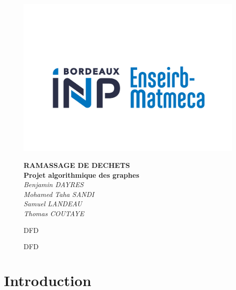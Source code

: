 \documentclass{report}
\begin{document}
\begin{titlepage}
\fancypagestyle{}{}
\begin{figure}[t]
    \centerline{\includegraphics[scale=0.4]{Logo.png}}
    \centering
	\vspace{1cm}
    {\huge\bfseries RAMASSAGE DE DECHETS \\}
    {\huge\bfseries Projet algorithmique des graphes \\}
	\vspace{2cm}
	{\Large\itshape Benjamin DAYRES \\ Mohamed Taha SANDI \\ Samuel LANDEAU \\ Thomas COUTAYE \\}
	\vspace{1cm}
	{\large DFD\par}
    {\large DFD\par}

\end{figure}
\end{titlepage}

\newpage

\renewcommand{\contentsname}{Table des matières}
\tableofcontents

\newpage

\section{\Large Introduction }
\end{document}
